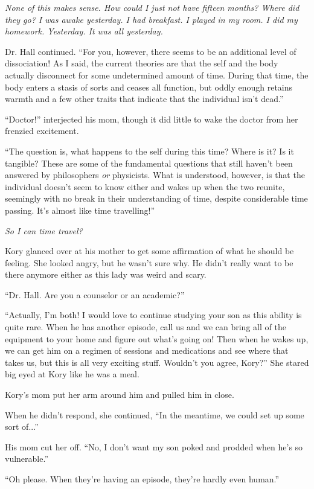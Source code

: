 \documentclass[9pt]{memoir}
\begin{document}
\textit{None of this makes sense. How could I just not have fifteen months? Where did they go? I was awake yesterday. I had breakfast. I played in my room. I did my homework. Yesterday. It was all yesterday.}

Dr. Hall continued. ``For you, however, there seems to be an additional level of dissociation! As I said, the current theories are that the self and the body actually disconnect for some undetermined amount of time. During that time, the body enters a stasis of sorts and ceases all function, but oddly enough retains warmth and a few other traits that indicate that the individual isn't dead.''

``Doctor!'' interjected his mom, though it did little to wake the doctor from her frenzied excitement.

``The question is, what happens to the self during this time? Where is it? Is it tangible? These are some of the fundamental questions that still haven't been answered by philosophers \textit{or} physicists. What is understood, however, is that the individual doesn't seem to know either and wakes up when the two reunite, seemingly with no break in their understanding of time, despite considerable time passing. It's almost like time travelling!''

\textit{So I can time travel?}

Kory glanced over at his mother to get some affirmation of what he should be feeling. She looked angry, but he wasn't sure why. He didn't really want to be there anymore either as this lady was weird and scary.

``Dr. Hall. Are you a counselor or an academic?''

``Actually, I'm both! I would love to continue studying your son as this ability is quite rare. When he has another episode, call us and we can bring all of the equipment to your home and figure out what's going on! Then when he wakes up, we can get him on a regimen of sessions and medications and see where that takes us, but this is all very exciting stuff. Wouldn't you agree, Kory?'' She stared big eyed at Kory like he was a meal.

Kory's mom put her arm around him and pulled him in close.

When he didn't respond, she continued, ``In the meantime, we could set up some sort of...''

His mom cut her off. ``No, I don't want my son poked and prodded when he's so vulnerable.''

``Oh please. When they're having an episode, they're hardly even human.''
\end{document}
